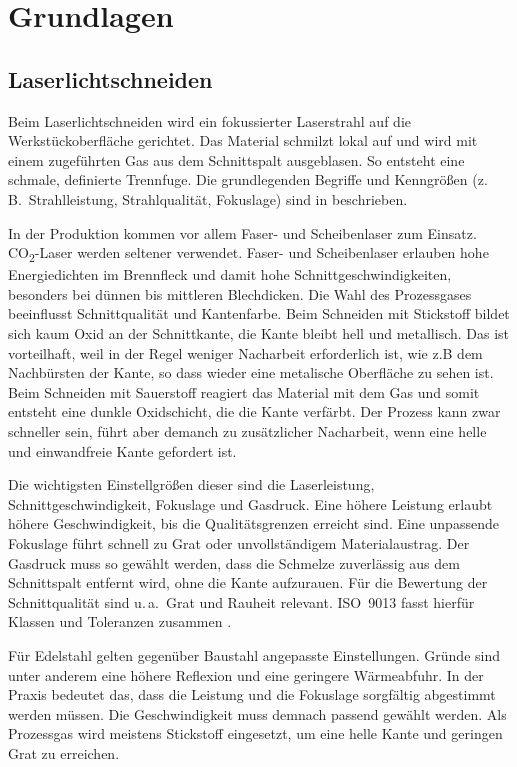 \chapter{Grundlagen}
\section{Laserlichtschneiden}

Beim Laserlichtschneiden wird ein fokussierter Laserstrahl auf die Werkstückoberfläche gerichtet. Das Material schmilzt lokal auf und wird mit einem zugeführten Gas aus dem Schnittspalt ausgeblasen. So entsteht eine schmale, definierte Trennfuge. Die grundlegenden Begriffe und Kenngrößen (z.\,B.\ Strahlleistung, Strahlqualität, Fokuslage) sind in \parencite{ISO11145-2018} beschrieben.

In der Produktion kommen vor allem Faser- und Scheibenlaser zum Einsatz. CO\textsubscript{2}-Laser werden seltener verwendet. Faser- und Scheibenlaser erlauben hohe Energiedichten im Brennfleck und damit hohe Schnittgeschwindigkeiten, besonders bei dünnen bis mittleren Blechdicken. Die Wahl des Prozessgases beeinflusst Schnittqualität und Kantenfarbe. Beim Schneiden mit Stickstoff bildet sich kaum Oxid an der Schnittkante, die Kante bleibt hell und metallisch. Das ist vorteilhaft, weil in der Regel weniger Nacharbeit erforderlich ist, wie z.B dem Nachbürsten der Kante, so dass wieder eine metalische Oberfläche zu sehen ist. Beim Schneiden mit Sauerstoff reagiert das Material mit dem Gas und somit entsteht eine dunkle Oxidschicht, die die Kante verfärbt. Der Prozess kann zwar schneller sein, führt aber demanch zu zusätzlicher Nacharbeit, wenn eine helle und einwandfreie Kante gefordert ist.

Die wichtigsten Einstellgrößen dieser sind die Laserleistung, Schnittgeschwindigkeit, Fokuslage und Gasdruck. Eine höhere Leistung erlaubt höhere Geschwindigkeit, bis die Qualitätsgrenzen erreicht sind. Eine unpassende Fokuslage führt schnell zu Grat oder unvollständigem Materialaustrag. Der Gasdruck muss so gewählt werden, dass die Schmelze zuverlässig aus dem Schnittspalt entfernt wird, ohne die Kante aufzurauen. Für die Bewertung der Schnittqualität sind u.\,a.\ Grat und Rauheit relevant. ISO~9013 fasst hierfür Klassen und Toleranzen zusammen \parencite{ISO9013-2017}.

Für Edelstahl gelten gegenüber Baustahl angepasste Einstellungen. Gründe sind unter anderem eine höhere Reflexion und eine geringere Wärmeabfuhr. In der Praxis bedeutet das, dass die Leistung und die Fokuslage sorgfältig abgestimmt werden müssen. Die Geschwindigkeit muss demnach passend gewählt werden. Als Prozessgas wird meistens Stickstoff eingesetzt, um eine helle Kante und geringen Grat zu erreichen.

